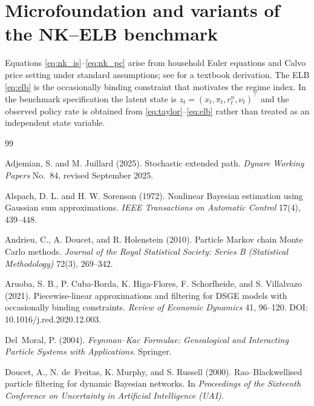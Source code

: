 \documentclass[11pt]{article}
\theoremstyle{remark}
\begin{document}
\section{Microfoundation and variants of the NK--ELB benchmark}
\label{app:nk}

Equations \eqref{eq:nk_is}--\eqref{eq:nk_pc} arise from household Euler equations and Calvo price setting under standard assumptions; see \citet{Woodford2003} for a textbook derivation.
The ELB \eqref{eq:elb} is the occasionally binding constraint that motivates the regime index.
In the benchmark specification the latent state is $z_t=(x_t,\pi_t,r_t^n,\nu_t)^\top$ and the observed policy rate is obtained from \eqref{eq:taylor}--\eqref{eq:elb} rather than treated as an independent state variable.

\begin{thebibliography}{99}

Adjemian, S. and M. Juillard (2025).
\newblock Stochastic extended path.
\newblock \emph{Dynare Working Papers} No.\ 84, revised September 2025.

Alspach, D. L. and H. W. Sorenson (1972).
\newblock Nonlinear Bayesian estimation using Gaussian sum approximations.
\newblock \emph{IEEE Transactions on Automatic Control} 17(4), 439--448.

Andrieu, C., A. Doucet, and R. Holenstein (2010).
\newblock Particle Markov chain Monte Carlo methods.
\newblock \emph{Journal of the Royal Statistical Society: Series B (Statistical Methodology)} 72(3), 269--342.

Aruoba, S. B., P. Cuba-Borda, K. Higa-Flores, F. Schorfheide, and S. Villalvazo (2021).
\newblock Piecewise-linear approximations and filtering for DSGE models with occasionally binding constraints.
\newblock \emph{Review of Economic Dynamics} 41, 96--120.
\newblock DOI: 10.1016/j.red.2020.12.003.

Del~Moral, P. (2004).
\newblock \emph{Feynman--Kac Formulae: Genealogical and Interacting Particle Systems with Applications}.
\newblock Springer.

Doucet, A., N. de~Freitas, K. Murphy, and S. Russell (2000).
\newblock Rao--Blackwellised particle filtering for dynamic Bayesian networks.
\newblock In \emph{Proceedings of the Sixteenth Conference on Uncertainty in Artificial Intelligence (UAI)}.


\end{thebibliography}
\end{document}
